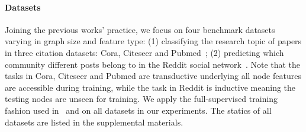\documentclass{article}
\begin{document}
\paragraph{Datasets} Joining the previous works' practice, we focus on four benchmark datasets varying in graph size and feature type: (1) classifying the research topic of papers in three citation datasets: Cora, Citeseer and Pubmed~\citep{sen2008collective}; (2) predicting which community different posts belong to in the Reddit social network~\citep{hamilton2017inductive}. Note that the tasks in Cora, Citeseer and Pubmed are transductive underlying all node features are accessible during training, while the task in Reddit is inductive meaning the testing nodes are unseen for training. We apply the full-supervised training fashion used in~\citet{Huang2018} and \citet{chen2018fastgcn} on all datasets in our experiments. The statics of all datasets are listed in the supplemental materials.
\end{document}
